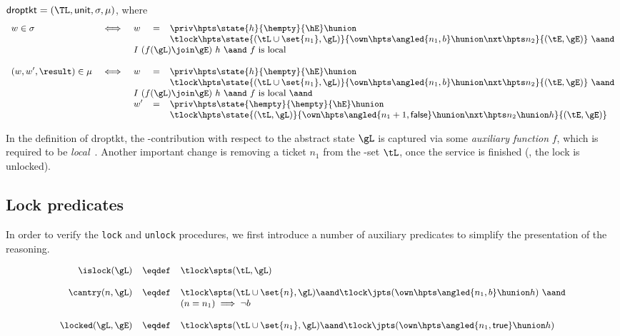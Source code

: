 \begin{definition}  
\label{def:incrown-act}
%
$\mathsf{droptkt} = (\TL, \mathsf{unit}, \sigma, \mu)$, where
\[
{\small
\begin{array}{lclcl}
w \in \sigma & \iff & 
  w & = & \priv \hpts \state{h}{\hempty}{\hE} \hunion \\   
  &&&& \tlock \hpts \state{(\tL \cup \set{n_1}, \gL)}{\own \hpts \angled{n_1, b} \hunion \nxt \hpts n_2}{(\tE, \gE)} ~\aand\\ 
  && \multicolumn{3}{l}{I~(f(\gL) \join \gE)~h ~\aand~ f~\text{is local}}
\\ \\
(w, w', \result) \in \mu & \iff & 
  w & = & \priv \hpts \state{h}{\hempty}{\hE} \hunion \\   
  &&&& \tlock \hpts \state{(\tL \cup \set{n_1}, \gL)}{\own \hpts \angled{n_1, b} \hunion \nxt \hpts n_2}{(\tE, \gE)} ~\aand\\ 
  && \multicolumn{3}{l}{I~(f(\gL) \join \gE)~h ~\aand~ f~\text{is
      local} ~\aand}\\ 
&& w' &=& \priv \hpts \state{\hempty}{\hempty}{\hE} \hunion \\   
  &&&& \tlock \hpts \state{(\tL, \gL)}{\own \hpts
    \angled{n_1 + 1, \mathsf{false}} \hunion \nxt \hpts n_2 \hunion
    h}{(\tE, \gE)}
\end{array}
}
\]
\end{definition}

In the definition of \textsf{droptkt}, the \self-contribution
with respect to the abstract state $\gL$ is captured via some
\emph{auxiliary function} $f$, which is required to be
\emph{local}~\cite{LeyWild-Nanevski:POPL13}. Another important change
is removing a ticket $n_1$ from the \self-set $\tL$, once the
service is finished (\ie, the lock is unlocked).

\subsection{Lock predicates}
\label{sec:spec-textttl-texttt}

In order to verify the \texttt{lock} and \texttt{unlock} procedures,
we first introduce a number of auxiliary predicates to simplify the
presentation of the reasoning.

\begin{definition}[$\TL$ predicates]
\label{def:predicates}
\[
\small{
\begin{array}{rcl}
  \islock(\gL) & \eqdef  &  \tlock \spts (\tL, \gL) \\
  \\
  \cantry(n, \gL) & \eqdef & \tlock \spts (\tL \cup \set{n}, \gL) \aand
  \tlock \jpts (\own \hpts \angled{n_1, b} \hunion h) ~\aand\\
  & & (n = n_1) \implies \neg b \\
  \\
  \locked(\gL, \gE) & \eqdef  &  \tlock \spts (\tL \cup \set{n_1}, \gL) \aand
  \tlock \jpts (\own \hpts \angled{n_1, \mathsf{true}} \hunion h) \\
\end{array}
}
\]
\end{definition}

